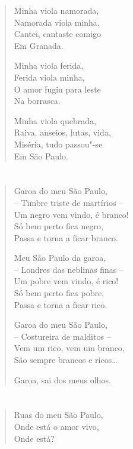 {\begin{verse}
Minha viola namorada,\\
Namorada viola minha,\\
Cantei, cantaste comigo\\
\qquad Em Granada.

Minha viola ferida,\\
Ferida viola minha,\\
O amor fugiu para leste\\
\qquad Na borrasca.

Minha viola quebrada,\\
Raiva, anseios, lutas, vida,\\
Miséria, tudo passou"-se\\
\qquad Em São Paulo.
\end{verse}


\chapter*{}

\begin{verse}
Garoa do meu São Paulo,\\
-- Timbre triste de martírios --\\
Um negro vem vindo, é branco!\\
Só bem perto fica negro,\\
Passa e torna a ficar branco.

Meu São Paulo da garoa,\\
-- Londres das neblinas finas --\\
Um pobre vem vindo, é rico!\\
Só bem perto fica pobre,\\
Passa e torna a ficar rico.

Garoa do meu São Paulo,\\
-- Costureira de malditos --\\
Vem um rico, vem um branco,\\
São sempre brancos e ricos\ldots{}

Garoa, sai dos meus olhos.
\end{verse}

\chapter*{}

\begin{verse}
Ruas do meu São Paulo,\\
Onde está o amor vivo,\\
Onde está?


\end{verse}}
